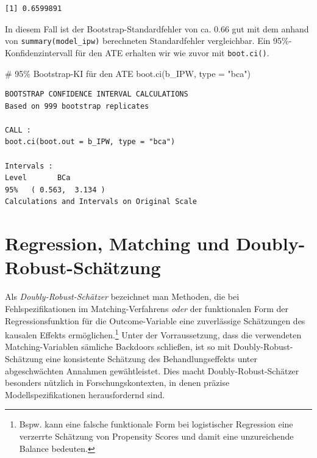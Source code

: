 \documentclass[
  a4paper,
  DIV=11,
  oneside]{scrreprt}
\newenvironment{Shaded}{\begin{snugshade}}{\end{snugshade}}
\newcommand{\AttributeTok}[1]{\textcolor[rgb]{0.40,0.45,0.13}{#1}}
\newcommand{\CommentTok}[1]{\textcolor[rgb]{0.37,0.37,0.37}{#1}}
\newcommand{\FunctionTok}[1]{\textcolor[rgb]{0.28,0.35,0.67}{#1}}
\newcommand{\NormalTok}[1]{\textcolor[rgb]{0.00,0.23,0.31}{#1}}
\newcommand{\SpecialCharTok}[1]{\textcolor[rgb]{0.37,0.37,0.37}{#1}}
\newcommand{\StringTok}[1]{\textcolor[rgb]{0.13,0.47,0.30}{#1}}
\begin{document}
\begin{Shaded}
\end{Shaded}

\begin{verbatim}
[1] 0.6599891
\end{verbatim}

In diesem Fall ist der Bootstrap-Standardfehler von ca. 0.66 gut mit dem
anhand von \texttt{summary(model\_ipw)} berechneten Standardfehler
vergleichbar. Ein 95\%-Konfidenzintervall für den ATE erhalten wir wie
zuvor mit \texttt{boot.ci()}.

\begin{Shaded}
\begin{Highlighting}[]
\CommentTok{\# 95\% Bootstrap{-}KI für den ATE}
\FunctionTok{boot.ci}\NormalTok{(b\_IPW, }\AttributeTok{type =} \StringTok{"bca"}\NormalTok{)}
\end{Highlighting}
\end{Shaded}

\begin{verbatim}
BOOTSTRAP CONFIDENCE INTERVAL CALCULATIONS
Based on 999 bootstrap replicates

CALL : 
boot.ci(boot.out = b_IPW, type = "bca")

Intervals : 
Level       BCa          
95%   ( 0.563,  3.134 )  
Calculations and Intervals on Original Scale
\end{verbatim}

\section{Regression, Matching und
Doubly-Robust-Schätzung}\label{regression-matching-und-doubly-robust-schuxe4tzung}

Als \emph{Doubly-Robust-Schätzer} bezeichnet man Methoden, die bei
Fehlspezifikationen im Matching-Verfahrens \emph{oder} der funktionalen
Form der Regressionsfunktion für die Outcome-Variable eine zuverlässige
Schätzungen des kausalen Effekts ermöglichen.\footnote{Bspw. kann eine
  falsche funktionale Form bei logistischer Regression eine verzerrte
  Schätzung von Propensity Scores und damit eine unzureichende Balance
  bedeuten.} Unter der Vorraussetzung, dass die verwendeten
Matching-Variablen sämliche Backdoors schließen, ist so mit
Doubly-Robust-Schätzung eine konsistente Schätzung des
Behandlungseffekts unter abgeschwächten Annahmen gewähtleistet. Dies
macht Doubly-Robust-Schätzer besonders nützlich in Forschungskontexten,
in denen präzise Modellspezifikationen herausfordernd sind.
\end{document}
